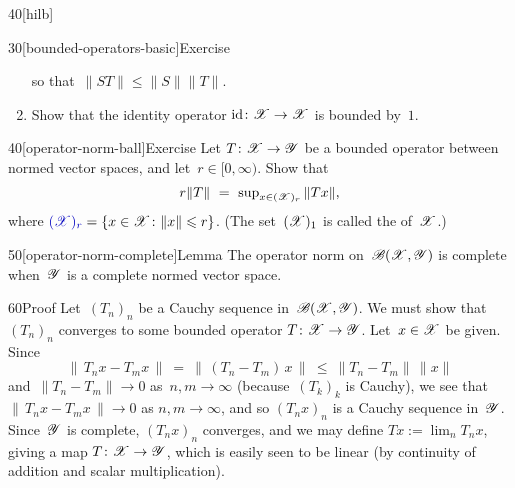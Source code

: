 \begin{parsec}{40}[hilb]
\begin{point}{30}[bounded-operators-basic]{Exercise}
\begin{enumerate}
so that~$\|ST\|\leq\|S\|\|T\|$.
\item
Show that the identity operator $\mathrm{id}\colon \mathscr{X}\to \mathscr{X}$
is bounded by~$1$.
\end{enumerate}
\end{point}
\begin{point}{40}[operator-norm-ball]{Exercise}%
Let $T\colon \mathscr{X}\to\mathscr{Y}$
be a bounded operator between normed vector spaces,
	and let~$r\in[0,\infty)$.
Show that 
	\begin{equation*}
		\textstyle
		r\|T\|\ =\ \sup_{x\in (\mathscr{X})_r} \|Tx\|,
	\end{equation*}
where $\Define{(\scrX)_r}=\{x\in \scrX\colon \|x\|\leq r\}$.%
%
	(The set~$(\mathscr{X})_1$
	is called the  of~$\mathscr{X}$.)%
\end{point}
\begin{point}{50}[operator-norm-complete]{Lemma}%
The operator norm on~$\mathscr{B}(\mathscr{X},\mathscr{Y})$ is complete
when~$\mathscr{Y}$ is a complete normed vector space.
\begin{point}{60}{Proof}%
Let~$(T_n)_n$ be a Cauchy sequence in~$\mathscr{B}(\mathscr{X},\mathscr{Y})$.
We must show that~$(T_n)_n$ converges to some
bounded operator $T\colon \mathscr{X}\to\mathscr{Y}$.
Let~$x\in \mathscr{X}$ be given.
Since 
\begin{equation*}
\|\,T_nx - T_mx\,\|\ =\ \|\,(T_n-T_m)\,x\,\|\ \leq\  \|T_n-T_m\|\,\|x\|
\end{equation*}
and~$\|T_n-T_m\|\to 0$ as~$n,m\to \infty$ 
(because~$(T_k)_k$ is Cauchy),
we see that $\|\,T_nx-T_mx\,\|\to 0$ as $n,m\to \infty$,
and so $(T_nx)_n$ is a Cauchy sequence in~$\mathscr{Y}$.
Since~$\mathscr{Y}$ is complete,
 $(T_nx)_n$ converges,
and  we may define $Tx:=\lim_n T_nx$,
giving a map $T\colon \mathscr{X}\to \mathscr{Y}$,
which is easily seen to be linear
(by continuity of addition and scalar multiplication).


\end{point}
\end{point}
\end{parsec}
